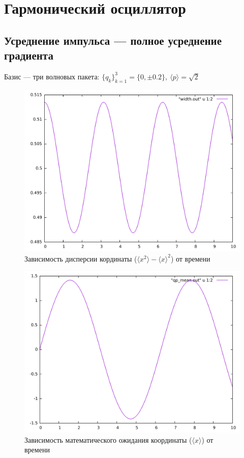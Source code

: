 \documentclass[a4paper,14pt]{extarticle}
\begin{document}
\section{Гармонический осциллятор}
\subsection{Усреднение импульса --- полное усреднение градиента}


Базис --- три волновых пакета: $\{q_k\}_{k=1}^3 = \{0, \pm 0.2\},\ \langle p\rangle = \sqrt{2}$
\begin{figure}[H]
\centering
\includegraphics[scale = 0.5]{../all/images/width_1.pdf}
\caption{Зависимость дисперсии кординаты ($\langle x^2\rangle-\langle x\rangle^2$) от времени}
\end{figure}
\begin{figure}[H]
\centering
\includegraphics[scale = 0.5]{../all/images/mean_q_t_1.pdf}
\caption{Зависимость математического ожидания координаты ($\langle x\rangle$) от времени}
\end{figure}
\end{document}
